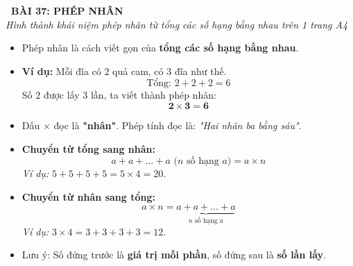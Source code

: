 \documentclass[11pt,a4paper]{article}
\begin{document}
\begin{tcolorbox}[
  enhanced,
  colback=violet!8!white,
  colframe=violet!70!black,
  arc=3mm, boxrule=1.2pt,
  left=3mm, right=3mm, top=2mm, bottom=2mm,
  halign=center
]
  {\LARGE\bfseries\color{violet!90!black}\faBookmark\ BÀI 37: PHÉP NHÂN}\\[1mm]
  {\itshape\footnotesize\color{black!75} Hình thành khái niệm phép nhân từ tổng các số hạng bằng nhau trên 1 trang A4}
\end{tcolorbox}

\vspace{-2mm}

\noindent
\begin{minipage}[t]{0.49\textwidth}\vspace{0pt}
\begin{tcolorbox}[
  enhanced,
  colback=violet!4!white,
  colframe=violet!75!black,
  arc=2mm, boxrule=0.8pt,
  left=2mm, right=2mm, top=1.8mm, bottom=1.8mm,
  title={\footnotesize\bfseries\color{white}\faKey\ 1. Khái niệm phép nhân}
]
{\footnotesize
\begin{itemize}\setlength{\itemsep}{1pt}\setlength{\leftskip}{-2.5mm}
  \item Phép nhân là cách viết gọn của \textbf{tổng các số hạng bằng nhau}.
  \item \textbf{Ví dụ:} Mỗi đĩa có $2$ quả cam, có $3$ đĩa như thế.
  $$\text{Tổng: } 2 + 2 + 2 = 6$$
  Số $2$ được lấy $3$ lần, ta viết thành phép nhân:
  $$\mathbf{2 \times 3 = 6}$$
  \item Dấu $\times$ đọc là \textbf{"nhân"}. Phép tính đọc là: \textit{"Hai nhân ba bằng sáu"}.
\end{itemize}
}
\end{tcolorbox}
\end{minipage}
\hfill
\begin{minipage}[t]{0.49\textwidth}\vspace{0pt}
\begin{tcolorbox}[
  enhanced,
  colback=teal!4!white,
  colframe=teal!75!black,
  arc=2mm, boxrule=0.8pt,
  left=2mm, right=2mm, top=1.8mm, bottom=1.8mm,
  title={\footnotesize\bfseries\color{white}\faSliders\ 2. Kĩ năng chuyển đổi tổng $\leftrightarrow$ tích}
]
{\footnotesize
\begin{itemize}\setlength{\itemsep}{1pt}\setlength{\leftskip}{-2.5mm}
  \item \textbf{Chuyển từ tổng sang nhân:}
  $$a + a + \dots + a \text{ ($n$ số hạng $a$)} = a \times n$$
  \textit{Ví dụ:} $5 + 5 + 5 + 5 = 5 \times 4 = 20$.
  \item \textbf{Chuyển từ nhân sang tổng:}
  $$a \times n = \underbrace{a + a + \dots + a}_{n\text{ số hạng } a}$$
  \textit{Ví dụ:} $3 \times 4 = 3 + 3 + 3 + 3 = 12$.
  \item Lưu ý: Số đứng trước là \textbf{giá trị mỗi phần}, số đứng sau là \textbf{số lần lấy}.
\end{itemize}
}
\end{tcolorbox}
\end{minipage}
\end{document}
